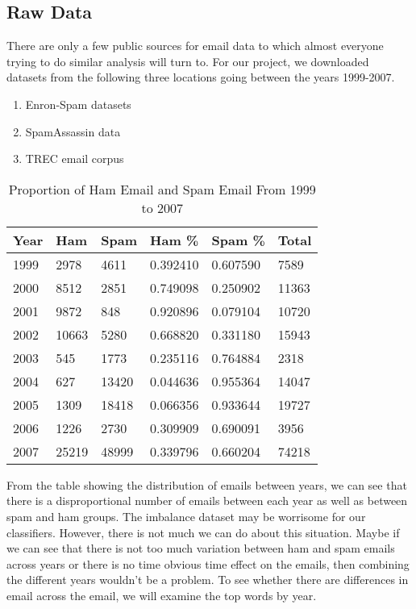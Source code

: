 \documentclass[12pt]{article}
\begin{document}
\subsection{Raw Data}
\quad There are only a few public sources for email data to which almost everyone trying to do similar analysis will turn to. For our project, we downloaded datasets from the following three locations going between the years 1999-2007. 

\begin{enumerate}
\item Enron-Spam datasets
\item SpamAssassin data
\item TREC email corpus
\end{enumerate}

\begin{table}[]
\centering
\caption{Proportion of Ham Email and Spam Email From 1999 to 2007}
\label{}
\begin{tabular}{@{}llllll@{}}
\toprule
Year & Ham   & Spam  & Ham \%   & Spam \%  & Total \\ \midrule
1999 & 2978  & 4611  & 0.392410 & 0.607590 & 7589  \\
2000 & 8512  & 2851  & 0.749098 & 0.250902 & 11363 \\
2001 & 9872  & 848   & 0.920896 & 0.079104 & 10720 \\
2002 & 10663 & 5280  & 0.668820 & 0.331180 & 15943 \\
2003 & 545   & 1773  & 0.235116 & 0.764884 & 2318  \\
2004 & 627   & 13420 & 0.044636 & 0.955364 & 14047 \\
2005 & 1309  & 18418 & 0.066356 & 0.933644 & 19727 \\
2006 & 1226  & 2730  & 0.309909 & 0.690091 & 3956  \\
2007 & 25219 & 48999 & 0.339796 & 0.660204 & 74218 \\ \bottomrule
\end{tabular}
\end{table}

From the table showing the distribution of emails between years, we can see that there is a disproportional number of emails between each year as well as between spam and ham groups. The imbalance dataset may be worrisome for our classifiers. However, there is not much we can do about this situation. Maybe if we can see that there is not too much variation between ham and spam emails across years or there is no time obvious time effect on the emails, then combining the different years wouldn't be a problem. To see whether there are differences in email across the email, we will examine the top words by year. 
\end{document}
